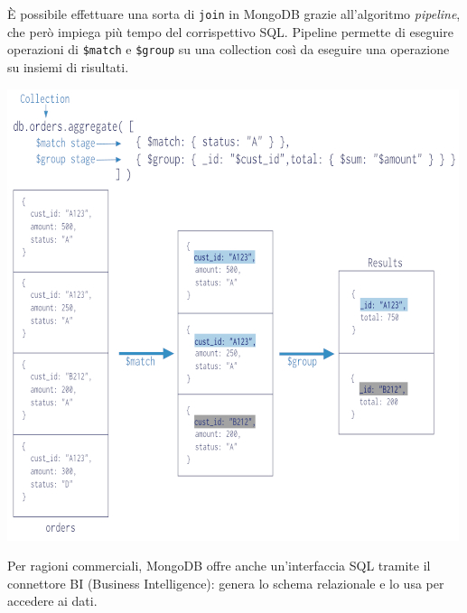 \documentclass[a4page, 11pt]{article}
\begin{document}
È possibile effettuare una sorta di \verb|join| in MongoDB grazie all'algoritmo \textit{pipeline}\cite{NoSQLDB}, che però impiega più tempo del corrispettivo SQL.
Pipeline permette di eseguire operazioni di \verb|$match| e \verb|$group| su una collection così da eseguire una operazione su insiemi di risultati.
\begin{center}
  \includegraphics[scale=0.6]{mongodb-pipeline.jpg}
\end{center}

Per ragioni commerciali, MongoDB offre anche un'interfaccia SQL tramite il connettore BI (Business Intelligence): genera lo schema relazionale e lo usa per accedere ai dati.
\end{document}
